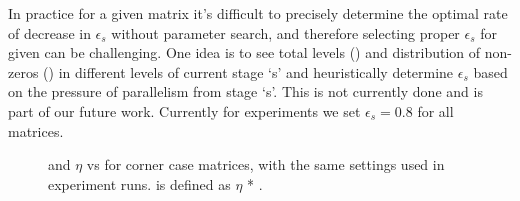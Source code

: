 In practice for a given matrix it's difficult to precisely determine the optimal rate of decrease in $\epsilon_s$ without parameter search, and therefore selecting proper $\epsilon_s$ for given \nthreads can be challenging. One idea is to see total levels (\totalLvl) and distribution of non-zeros (\nnz) in different levels of current stage `s' and heuristically determine $\epsilon_s$ based on the pressure of parallelism from stage `s'. This is not currently done and is part of our future work. Currently for experiments we set $\epsilon_s=0.8$ for all matrices.

\begin{figure}[tbhp]
	\centering
	\caption{\threadEff and $\eta$ vs \nthreads for corner case matrices, with the same settings used in experiment runs. \threadEff is defined as $\eta$ * \nthreads.}
	\label{fig:corner_cases_param}
\end{figure}

